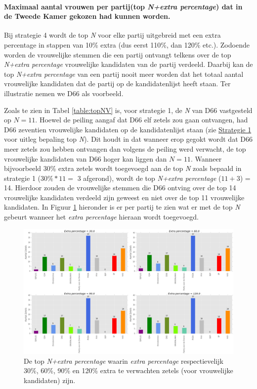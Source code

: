 \paragraph{Maximaal aantal vrouwen per partij(top \textit{N+extra percentage}) dat in de Tweede Kamer gekozen had kunnen worden.} 
Bij strategie 4 wordt de top \textit{N} voor elke partij uitgebreid met een extra percentage in stappen van 10\% extra (dus eerst 110\%, dan 120\% etc.). Zodoende worden de vrouwelijke stemmen die een partij ontvangt telkens over de top \textit{N+extra percentage} vrouwelijke kandidaten van de partij verdeeld. Daarbij kan de top \textit{N+extra percentage} van een partij nooit meer worden dat het totaal aantal vrouwelijke kandidaten dat de partij op de kandidatenlijst heeft staan. Ter illustratie nemen we D66 als voorbeeld. 

Zoals te zien in Tabel \ref{table:topNV} is, voor strategie 1, de \textit{N} van D66 vastgesteld op $N=11$. Hoewel de peiling aangaf dat D66 elf zetels zou gaan ontvangen, had D66 zeventien vrouwelijke kandidaten op de kandidatenlijst staan (zie \hyperref[S1V]{Strategie 1} voor uitleg bepaling top \textit{N}). Dit houdt in dat wanneer erop gegokt wordt dat D66 meer zetels zou hebben ontvangen dan volgens de peiling werd verwacht, de top vrouwelijke kandidaten van D66 hoger kan liggen dan $N=11$. Wanneer bijvoorbeeld 30\% extra zetels wordt toegevoegd aan de top \textit{N} zoals bepaald in strategie 1 ($30\%*11 =$ 3 afgerond), wordt de top \textit{N+extra percentage} ($11+3$) = 14. Hierdoor zouden de vrouwelijke stemmen die D66 ontving over de top 14 vrouwelijke kandidaten verdeeld zijn geweest en niet over de top 11 vrouwelijke kandidaten. In Figuur \ref{fig:NexpV} hieronder is er per partij te zien wat er met de top \textit{N} gebeurt wanneer het \textit{extra percentage} hieraan wordt toegevoegd.      


\begin{figure}[H]

	\includegraphics[width=\linewidth]{topn_vermenigvuldiging2.png}

			\caption{De top \textit{N+extra percentage} waarin \textit{extra percentage} respectievelijk 30\%, 60\%, 90\% en 120\% extra te verwachten zetels (voor vrouwelijke kandidaten) zijn.}

\label{fig:NexpV}
\end{figure}

